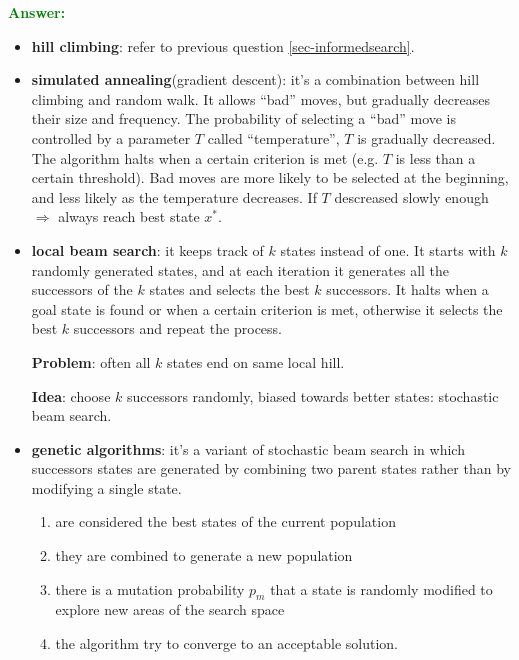 \documentclass[12pt]{article}
\begin{document}
\begin{enumerate}[label=\textbf{IS.II.\arabic*}]
    \textcolor{green}{\textbf{Answer:}}
    \begin{itemize}
        \item \textbf{hill climbing}: refer to previous question \ref{sec-informedsearch}.
        \item \textbf{simulated annealing}(gradient descent): it's a combination between hill climbing and random walk. 
        It allows ``bad'' moves, but gradually decreases their size and frequency.
        The probability of selecting a ``bad'' move is controlled by a parameter $T$ called ``temperature'', $T$ is gradually decreased.
        The algorithm halts when a certain criterion is met (e.g. $T$ is less than a certain threshold).
        Bad moves are more likely to be selected at the beginning, and less likely as the temperature decreases.
        If $T$ descreased slowly enough $\Rightarrow$ always reach best state $x^*$.
        \item \textbf{local beam search}: it keeps track of $k$ states instead of one.
        It starts with $k$ randomly generated states, and at each iteration it generates all the successors of the $k$ states and selects the best $k$ successors.
        It halts when a goal state is found or when a certain criterion is met, otherwise it selects the best $k$ successors and repeat the process.

        \textbf{Problem}: often all $k$ states end on same local hill.

        \textbf{Idea}: choose $k$ successors randomly, biased towards better states: stochastic beam search.
        
        \item \textbf{genetic algorithms}: it's a variant of stochastic beam search in which successors
        states are generated by combining two parent states rather than by modifying a single state.
        \begin{enumerate}
            \item are considered the best states of the current population
            \item they are combined to generate a new population
            \item there is a mutation probability $p_m$ that a state is randomly modified to explore new areas of the search space
            \item the algorithm try to converge to an acceptable solution.
        \end{enumerate}


    \end{itemize}
\end{enumerate}
\end{document}
